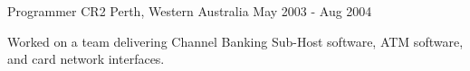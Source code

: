 \begin{cventries}
  \cventry
    {Programmer}
    {CR2}
    {Perth, Western Australia}
    {May 2003 - Aug 2004}
    {
      \begin{cvitems}
        \item {Worked on a team delivering Channel Banking Sub-Host software, ATM software, and card network interfaces.}
      \end{cvitems}
    }

\end{cventries}

